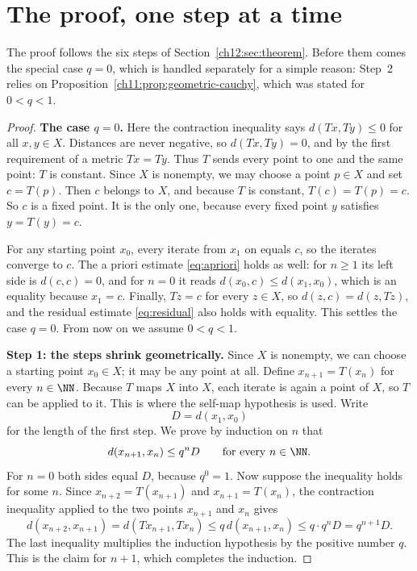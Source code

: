 \section{The proof, one step at a time}\label{ch12:sec:proof}
The proof follows the six steps of Section~\ref{ch12:sec:theorem}. Before them comes the special case $q=0$, which is handled separately for a simple reason: Step~2 relies on Proposition~\ref{ch11:prop:geometric-cauchy}, which was stated for $0<q<1$.

\begin{proof}
\textbf{The case $q=0$.} Here the contraction inequality says $d(Tx,Ty)\le0$ for all $x,y\in X$. Distances are never negative, so $d(Tx,Ty)=0$, and by the first requirement of a metric $Tx=Ty$. Thus $T$ sends every point to one and the same point: $T$ is constant. Since $X$ is nonempty, we may choose a point $p\in X$ and set $c=T(p)$. Then $c$ belongs to $X$, and because $T$ is constant, $T(c)=T(p)=c$. So $c$ is a fixed point. It is the only one, because every fixed point $y$ satisfies $y=T(y)=c$.

For any starting point $x_0$, every iterate from $x_1$ on equals $c$, so the iterates converge to $c$. The a priori estimate \eqref{eq:apriori} holds as well: for $n\ge1$ its left side is $d(c,c)=0$, and for $n=0$ it reads $d(x_0,c)\le d(x_1,x_0)$, which is an equality because $x_1=c$. Finally, $Tz=c$ for every $z\in X$, so $d(z,c)=d(z,Tz)$, and the residual estimate \eqref{eq:residual} also holds with equality. This settles the case $q=0$. From now on we assume $0<q<1$.

\textbf{Step 1: the steps shrink geometrically.} Since $X$ is nonempty, we can choose a starting point $x_0\in X$; it may be any point at all. Define $x_{n+1}=T(x_n)$ for every $n\in\NN$. Because $T$ maps $X$ into $X$, each iterate is again a point of $X$, so $T$ can be applied to it. This is where the self-map hypothesis is used. Write
\[
D=d(x_1,x_0)
\]
for the length of the first step. We prove by induction on $n$ that
\[
d(x_{n+1},x_n)\le q^nD\qquad\text{for every }n\in\NN.
\]
For $n=0$ both sides equal $D$, because $q^0=1$. Now suppose the inequality holds for some $n$. Since $x_{n+2}=T(x_{n+1})$ and $x_{n+1}=T(x_n)$, the contraction inequality applied to the two points $x_{n+1}$ and $x_n$ gives
\[
d(x_{n+2},x_{n+1})=d(Tx_{n+1},Tx_n)
\le q\,d(x_{n+1},x_n)\le q\cdot q^nD=q^{n+1}D.
\]
The last inequality multiplies the induction hypothesis by the positive number $q$. This is the claim for $n+1$, which completes the induction.


\end{proof}
